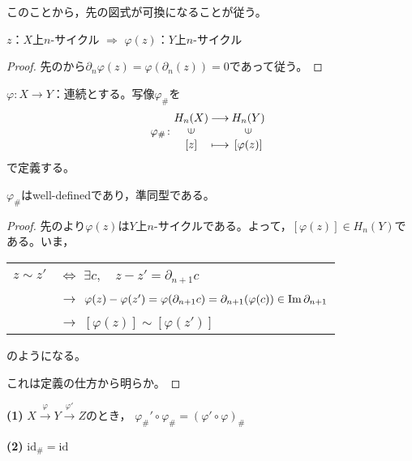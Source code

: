 \documentclass[uplatex]{jsarticle}
\begin{document}
このことから，先の図式が可換になることが従う。

\begin{hodai}
  \label{homology1.cycle}
  $z$：$X$上$n$-サイクル $\Longrightarrow$ $\varphi(z)$：$Y$上$n$-サイクル
\end{hodai}

\begin{proof}
  先のから$\partial_{n} \varphi(z) = \varphi (\partial_{n} (z)) = 0$であって従う。
\end{proof}

\begin{teigi}
  $\varphi \colon X \longrightarrow Y$：連続とする。写像$\varphi_{\#}$を
  \begin{equation}
    \varphi_{\#} \colon \mapdef{H_{n}(X)}{H_{n}(Y)}{\left[ z \right]}{\left[ \varphi(z) \right]}
  \end{equation}
  で定義する。
\end{teigi}

\begin{hodai}
  $\varphi_{\#}$はwell-definedであり，準同型である。
\end{hodai}

\begin{proof}

  先のより$\varphi(z)$は$Y$上$n$-サイクルである。よって，$[\varphi(z)] \in H_{n}(Y)$である。いま，
  \renewcommand{\arraystretch}{1}
  \begin{tabular}{l@{\,}l}
    $z \sim z'$ & $\Longleftrightarrow$ $\exists c, \quad z - z' = \partial_{n+1} c$ \\
    & $\longrightarrow$ $\varphi(z) - \varphi(z') = \varphi (\partial_{n+1} c) = \partial_{n+1} (\varphi(c)) \in \operatorname{Im} \partial_{n+1}$ \\
    & $\longrightarrow$ $[\varphi(z)] \sim [\varphi(z')]$
  \end{tabular}
  \renewcommand{\arraystretch}{1.3}
  のようになる。

  \sukima {}

  これは定義の仕方から明らか。
\end{proof}

\begin{hodai}
  {\bf (1)} $X \xrightarrow{\varphi} Y \xrightarrow{\varphi'} Z$のとき，
  $\varphi_{\#}' \circ \varphi_{\#} = (\varphi' \circ \varphi)_{\#}$

  {\bf (2)} $\mathrm{id}_{\#} = \mathrm{id}$
\end{hodai}
\end{document}
